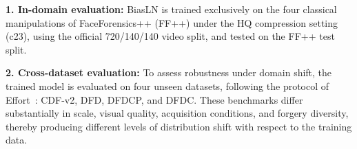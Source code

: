 \documentclass[fonts]{icst}
\newif\ifrevmark\revmarkfalse
\newcommand{\rev}[1]{\ifrevmark{\color{revblue}#1}\else#1\fi}
\begin{document}
\begin{table}[h]
  \centering
  \caption{Datasets used for training and evaluation.
NoGenMethod denotes the number of forgery methods in each dataset.}
  \label{tab:datasets}
  \small
  \setlength{\tabcolsep}{2pt}
  \renewcommand{\arraystretch}{1.1}
\end{table}

\textbf{1. In-domain evaluation:}
BiasLN is trained exclusively on the four classical manipulations of FaceForensics++ (FF++) under the HQ compression setting (c23)\rev{, using the official 720/140/140 video split, and tested on the FF++ test split.}

\textbf{2. Cross-dataset evaluation:}
To assess robustness under domain shift, the trained model is evaluated on \rev{four} unseen datasets\rev{, following the protocol of Effort~\cite{yan2025effort}}: CDF-v2, DFD, DFDCP, and DFDC.
These benchmarks differ substantially in scale, visual quality, acquisition conditions, and forgery diversity, thereby producing different levels of distribution shift with respect to the training data.
\end{document}
